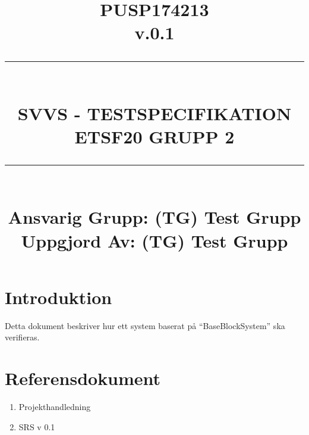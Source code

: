 \documentclass[paper=a4, fontsize=11pt,twoside]{article}
\title{
		\documentNumber{#1}																						
		\documentVersion{#2}																				
		\HRule{0.5pt} \\ %
		\LARGE \textbf{\uppercase{#3}} \\
		\large \textbf{\uppercase{ETSF20 Grupp 2}} 
		\HRule{2pt} \\ [1.5cm]    
		\normalsize            
		\documentResponsible{#4} \\ 
		\documentCreator{#4}  
	}
\newcommand{\HRule}[1]{\rule{\linewidth}{#1}}
\newcommand{\documentNumber}[1]{\centering PUSP1742#1 \\[1.0cm]}
\newcommand{\documentVersion}[1]{\centering \small{v.#1} \\[1.0cm]}
\newcommand{\documentResponsible}[1]{\centering  Ansvarig Grupp: #1}
\newcommand{\documentCreator}[1]{\centering Uppgjord Av: #1}
\newcommand{\grouptitlepage}[4]{ 
	\title{
		\documentNumber{#1}																						
		\documentVersion{#2}																				
		\HRule{0.5pt} \\ %
		\LARGE \textbf{\uppercase{#3}} \\
		\large \textbf{\uppercase{ETSF20 Grupp 2}} 
		\HRule{2pt} \\ [1.5cm]    
		\normalsize            
		\documentResponsible{#4} \\ 
		\documentCreator{#4}  
	}																							
	\maketitle																							
	\thispagestyle{empty} 																					
	\newpage 
}
\begin{document}
\grouptitlepage
{13	}
{0.1}
{SVVS - Testspecifikation}
{(TG) Test Grupp} %
\tableofcontents
\section{Introduktion}

 Detta dokument beskriver hur ett system baserat på “BaseBlockSystem”
 ska verifieras.
 

\section{Referensdokument}

\begin{enumerate}
\item Projekthandledning
\item SRS v 0.1
\end{enumerate}
\end{document}
